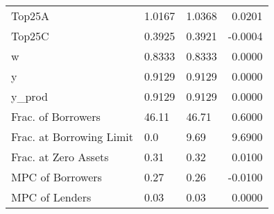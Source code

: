 \begin{table}
\begin{tabular}{lllr}
                  Top25A &  1.0167 &   1.0368 &  0.0201 \\
                  Top25C &  0.3925 &   0.3921 & -0.0004 \\
                       w &  0.8333 &   0.8333 &  0.0000 \\
                       y &  0.9129 &   0.9129 &  0.0000 \\
                  y\_prod &  0.9129 &   0.9129 &  0.0000 \\
      Frac. of Borrowers &   46.11 &    46.71 &  0.6000 \\
Frac. at Borrowing Limit &     0.0 &     9.69 &  9.6900 \\
    Frac. at Zero Assets &    0.31 &     0.32 &  0.0100 \\
        MPC of Borrowers &    0.27 &     0.26 & -0.0100 \\
          MPC of Lenders &    0.03 &     0.03 &  0.0000 \\
\bottomrule
\end{tabular}
\end{table}
